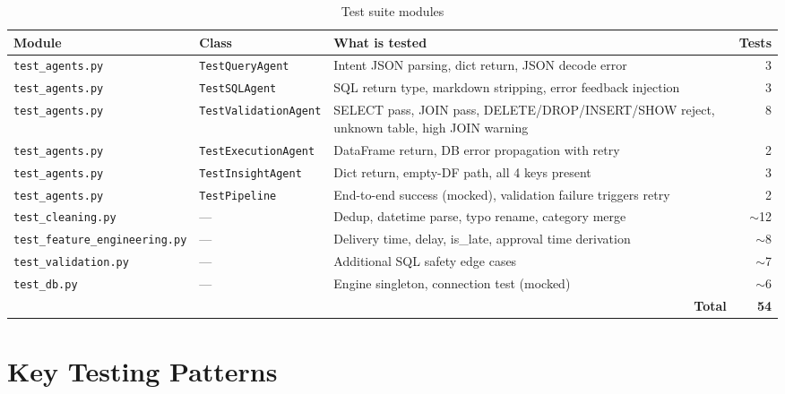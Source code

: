 \documentclass[12pt,a4paper]{report}
\begin{document}
\begin{table}[H]
  \centering
  \caption{Test suite modules}
  \label{tab:tests}
  \renewcommand{\arraystretch}{1.3}
  \begin{tabularx}{\textwidth}{llXr}
    \toprule
    \textbf{Module} & \textbf{Class} & \textbf{What is tested} & \textbf{Tests} \\
    \midrule
    \texttt{test\_agents.py}       & \texttt{TestQueryAgent}      & Intent JSON parsing, dict return, JSON decode error & 3 \\
    \texttt{test\_agents.py}       & \texttt{TestSQLAgent}        & SQL return type, markdown stripping, error feedback injection & 3 \\
    \texttt{test\_agents.py}       & \texttt{TestValidationAgent} & SELECT pass, JOIN pass, DELETE/DROP/INSERT/SHOW reject, unknown table, high JOIN warning & 8 \\
    \texttt{test\_agents.py}       & \texttt{TestExecutionAgent}  & DataFrame return, DB error propagation with retry & 2 \\
    \texttt{test\_agents.py}       & \texttt{TestInsightAgent}    & Dict return, empty-DF path, all 4 keys present & 3 \\
    \texttt{test\_agents.py}       & \texttt{TestPipeline}        & End-to-end success (mocked), validation failure triggers retry & 2 \\
    \texttt{test\_cleaning.py}     & —                            & Dedup, datetime parse, typo rename, category merge & $\sim$12 \\
    \texttt{test\_feature\_engineering.py} & —                   & Delivery time, delay, is\_late, approval time derivation & $\sim$8 \\
    \texttt{test\_validation.py}   & —                            & Additional SQL safety edge cases & $\sim$7 \\
    \texttt{test\_db.py}           & —                            & Engine singleton, connection test (mocked) & $\sim$6 \\
    \midrule
    \multicolumn{3}{r}{\textbf{Total}} & \textbf{54} \\
    \bottomrule
  \end{tabularx}
\end{table}

\section{Key Testing Patterns}
\end{document}
